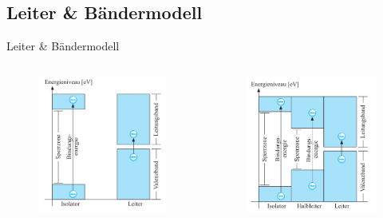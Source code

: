 \documentclass[12pt%
,aspectratio=169%
]{beamer}
\begin{document}
\subsection{Leiter \& Bändermodell}
\begin{frame}{Leiter \& Bändermodell}
\begin{columns}[T] %
\begin{column}{.48\textwidth}
\vspace*{-0.2cm}
\begin{figure}
\center
\includegraphics[scale=.45]{pictures/baendermod}
\end{figure}
\end{column}%
\hfill%
\begin{column}{.48\textwidth}
\vspace*{-0.3cm}
\begin{figure}
\center
\includegraphics[scale=.45]{pictures/halbleiter_band}
\end{figure}
\end{column}%
\end{columns}
\end{frame}
\end{document}
